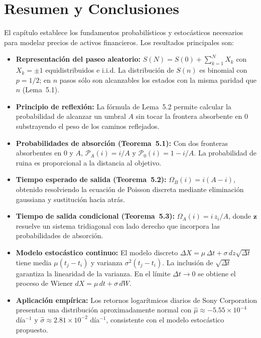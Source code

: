 \documentclass[12pt]{article}
\begin{document}
\section{Resumen y Conclusiones}

El cap\'itulo establece los fundamentos probabil\'isticos y estoc\'asticos necesarios
para modelar precios de activos financieros. Los resultados principales son:

\begin{itemize}

  \item \textbf{Representaci\'on del paseo aleatorio:}
        $S(N) = S(0) + \sum_{k=1}^N X_k$ con $X_k = \pm 1$ equidistribuidos e i.i.d.
        La distribuci\'on de $S(n)$ es binomial con $p = 1/2$; en $n$ pasos s\'olo son
        alcanzables los estados con la misma paridad que $n$ (Lema~5.1).

  \item \textbf{Principio de reflexi\'on:}
        La f\'ormula de Lema~5.2 permite calcular la probabilidad de alcanzar un umbral $A$
        sin tocar la frontera absorbente en $0$ substrayendo el peso de los caminos
        reflejados.

  \item \textbf{Probabilidades de absorci\'on (Teorema~5.1):}
        Con dos fronteras absorbentes en $0$ y $A$, $\mathcal{P}_A(i) = i/A$ y
        $\mathcal{P}_0(i) = 1 - i/A$. La probabilidad de ruina es proporcional a la
        distancia al objetivo.

  \item \textbf{Tiempo esperado de salida (Teorema~5.2):}
        $\Omega_B(i) = i(A-i)$, obtenido resolviendo la ecuaci\'on de Poisson discreta
        mediante eliminaci\'on gaussiana y sustituci\'on hacia atr\'as.

  \item \textbf{Tiempo de salida condicional (Teorema~5.3):}
        $\Omega_A(i) = i\,z_i/A$, donde $\mathbf{z}$ resuelve un sistema tridiagonal
        con lado derecho que incorpora las probabilidades de absorci\'on.

  \item \textbf{Modelo estoc\'astico continuo:}
        El modelo discreto $\Delta X = \mu\,\Delta t + \sigma\,dz\sqrt{\Delta t}$
        tiene media $\mu(t_j - t_i)$ y varianza $\sigma^2(t_j - t_i)$. La inclusi\'on
        de $\sqrt{\Delta t}$ garantiza la linearidad de la varianza. En el l\'imite
        $\Delta t \to 0$ se obtiene el proceso de Wiener $dX = \mu\,dt + \sigma\,dW$.

  \item \textbf{Aplicaci\'on emp\'irica:}
        Los retornos logar\'itmicos diarios de Sony Corporation presentan una
        distribuci\'on aproximadamente normal con $\hat{\mu} \approx -5.55 \times 10^{-4}$
        d\'ia$^{-1}$ y $\hat{\sigma} \approx 2.81 \times 10^{-2}$ d\'ia$^{-1}$,
        consistente con el modelo estoc\'astico propuesto.

\end{itemize}
\end{document}
